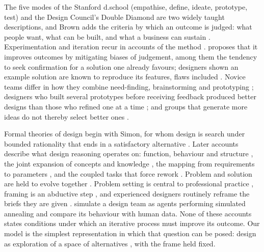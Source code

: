 \documentclass[preprint,review,11pt,authoryear]{elsarticle}
\theoremstyle{definition}
\begin{document}
The five modes of the Stanford d.school (empathise, define, ideate, prototype, test) \citep{dschool2010} and the Design Council's Double Diamond \citep{designcouncil2007} are two widely taught descriptions, and Brown adds the criteria by which an outcome is judged: what people want, what can be built, and what a business can sustain \citep{brown2008, brown2009}. Experimentation and iteration recur in accounts of the method \citep{carlgren2016, micheli2019}. \citet{liedtka2015} proposes that it improves outcomes by mitigating biases of judgement, among them the tendency to seek confirmation for a solution one already favours; designers shown an example solution are known to reproduce its features, flaws included \citep{jansson1991}. Novice teams differ in how they combine need-finding, brainstorming and prototyping \citep{seidel2013}; designers who built several prototypes before receiving feedback produced better designs than those who refined one at a time \citep{dow2010}; and groups that generate more ideas do not thereby select better ones \citep{rietzschel2006}.

Formal theories of design begin with Simon, for whom design is search under bounded rationality that ends in a satisfactory alternative \citep{simon1956, simon1996}. Later accounts describe what design reasoning operates on: function, behaviour and structure \citep{gero2004}, the joint expansion of concepts and knowledge \citep{hatchuel2009}, the mapping from requirements to parameters \citep{suh1990}, and the coupled tasks that force rework \citep{smitheppinger1997}. Problem and solution are held to evolve together \citep{maherpoon1996, dorstcross2001}. Problem setting is central to professional practice \citep{schon1983}, framing is an abductive step \citep{dorst2011}, and experienced designers routinely reframe the briefs they are given \citep{paton2011}. \citet{mccomb2015} simulate a design team as agents performing simulated annealing and compare its behaviour with human data. None of these accounts states conditions under which an iterative process must improve its outcome. Our model is the simplest representation in which that question can be posed: design as exploration of a space of alternatives \citep{woodbury2006}, with the frame held fixed.
\end{document}
